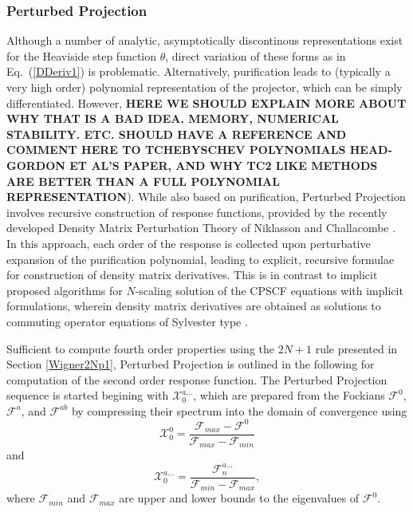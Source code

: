 \documentclass[prl,aps,letterpaper,twocolumn,showpacs,twocolumngrid,superbib]{revtex4}
\def\F{\mathcal{F}}
\def\X{\mathcal{X}}
\begin{document}
\newpage

\subsubsection{Perturbed Projection}\label{ResponseFunctions}

Although a number of analytic, asymptotically discontinous representations exist for the Heaviside 
step function $\theta$, direct variation of these forms as in Eq.~(\ref{DDeriv1}) is problematic.  
Alternatively, purification leads to (typically a very high order) polynomial representation of the projector, 
which can be simply differentiated.   However, {\bf HERE WE SHOULD EXPLAIN MORE ABOUT WHY THAT IS A BAD
IDEA. MEMORY, NUMERICAL STABILITY.  ETC.  SHOULD HAVE A REFERENCE AND COMMENT HERE TO TCHEBYSCHEV POLYNOMIALS 
HEAD-GORDON ET AL'S PAPER, AND WHY TC2 LIKE METHODS ARE BETTER THAN A FULL POLYNOMIAL REPRESENTATION}).  
While also based on purification, Perturbed Projection involves recursive construction of response functions, 
provided by the recently developed Density Matrix Perturbation Theory of Niklasson and Challacombe \cite{ANiklasson04}.
In this approach, each order of the response is collected upon perturbative expansion of the purification polynomial,   
leading to explicit, recursive formulae for construction of density matrix derivatives.
This is in contrast to implicit proposed algorithms for $N$-scaling solution of the CPSCF equations with implicit formulations, 
wherein density matrix derivatives are obtained as solutions to commuting operator equations of Sylvester type 
\cite{Ochsenfeld97,Helgaker_2001}.

Sufficient to compute fourth order properties using the $2 N+1$ rule presented in Section \ref{Wigner2Np1}, 
Perturbed Projection is outlined in the following for computation of the second order response function.  
The Perturbed Projection sequence is started begining with $\X^{a\ldots}_{0}$, which are 
prepared from the Fockians $\F^0$, $\F^a$,  and $\F^{ab}$ by  compressing their spectrum into the domain of 
convergence \cite{ANiklasson02A} using
\begin{equation}
    \X^0_{0}=\frac{\F_{max}-\F^0}{\F_{max}-\F_{min}} 
\end{equation}
and 
\begin{equation}
    \X^{a\ldots}_{0}=\frac{\F^{a\ldots}_{n}}{\F_{min}-\F_{max}},
\end{equation}
where $\F_{min}$ and $\F_{max}$ are upper and lower bounds to the eigenvalues of $\F^0$.  
\end{document}
